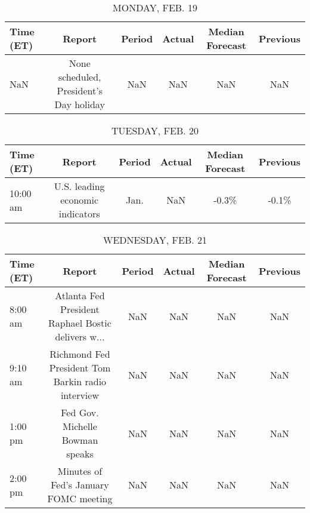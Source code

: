 \documentclass{article}%
\begin{document}
%
\normalsize%


\begin{table}[htbp]%
\caption{MONDAY, FEB. 19}%
\centering%
\begin{adjustbox}{width=1\textwidth}%
\begin{tabular}{lccccc}
\toprule
Time (ET) &                                  Report & Period & Actual & Median Forecast & Previous \\
\midrule
      NaN & None scheduled, President's Day holiday &    NaN &    NaN &             NaN &      NaN \\
\bottomrule
\end{tabular}
%
\end{adjustbox}%
\end{table}

%


\begin{table}[htbp]%
\caption{TUESDAY, FEB. 20}%
\centering%
\begin{adjustbox}{width=1\textwidth}%
\begin{tabular}{lccccc}
\toprule
Time (ET) &                           Report & Period & Actual & Median Forecast & Previous \\
\midrule
 10:00 am & U.S. leading economic indicators &   Jan. &    NaN &           -0.3\% &    -0.1\% \\
\bottomrule
\end{tabular}
%
\end{adjustbox}%
\end{table}

%


\begin{table}[htbp]%
\caption{WEDNESDAY, FEB. 21}%
\centering%
\begin{adjustbox}{width=1\textwidth}%
\begin{tabular}{lccccc}
\toprule
Time (ET) &                                             Report & Period & Actual & Median Forecast & Previous \\
\midrule
  8:00 am & Atlanta Fed President Raphael Bostic delivers w... &    NaN &    NaN &             NaN &      NaN \\
  9:10 am &  Richmond Fed President Tom Barkin radio interview &    NaN &    NaN &             NaN &      NaN \\
  1:00 pm &                    Fed Gov. Michelle Bowman speaks &    NaN &    NaN &             NaN &      NaN \\
  2:00 pm &              Minutes of Fed's January FOMC meeting &    NaN &    NaN &             NaN &      NaN \\
\bottomrule
\end{tabular}
%
\end{adjustbox}%
\end{table}
\end{document}
